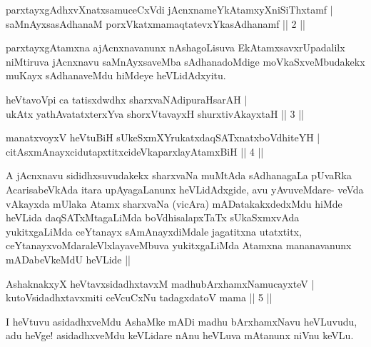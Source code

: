 \begin{shl}
parxtayxgAdhxvXnatxsamuceCxVdi jAcnxnameYkAtamxyXniSiThxtamf |\\
saMnAyxsasAdhanaM porxVkatxmamaqtatevxYkasAdhanamf \hfill || 2 ||
\end{shl}

\begin{artha}
parxtayxgAtamxna ajAcnxnavanunx nAshagoLisuva EkAtamxsavxrUpadalilx niMtiruva jAcnxnavu saMnAyxsaveMba sAdhanadoMdige moVkaSxveMbudakekx muKayx sAdhanaveMdu hiMdeye heVLidAdxyitu.
\end{artha}


\begin{shl}
heVtavoV\s pi ca tatisxdwdhx sharxvaNAdipuraHsarAH |\\
ukAtx yathAvatatxterxYva shorxVtavayxH shurxtivAkayxtaH \hfill || 3 ||
\end{shl}
\begin{shl}
manatxvoyxV heVtuBiH sUkeSxmXYrukatxdaqSATxnatxboVdhiteYH |\\
citAsxmAnayxcidutapxtitxcideVkaparxlayAtamxBiH \hfill || 4 ||
\end{shl}

\begin{artha}
A jAcnxnavu sididhxsuvudakekx sharxvaNa muMtAda sAdhanagaLa pUvaRka
Acarisa\-beVkAda itara upAyagaLanunx heVLidAdxgide, avu yAvuveMdare-
veVda vAkayxda mUlaka Atamx sharxvaNa (vicAra) mADatakakxdedxMdu hiMde
heVLida daqSATxMtagaLiMda boVdhisalapxTaTx sUkaSxmxvAda yukitxgaLiMda
ceYtanayx sAmAnayxdiMdale jagatitxna utatxtitx,
ceYtanayxvoMdaraleVlx\-layaveMbuva yukitxgaLiMda Atamxna mananavanunx
mADabeVkeMdU heVLide ||
\end{artha}


\begin{shl}
AshaknakxyX heVtavxsidadhxtavxM madhubArxhamxNamucayxteV |\\
kutoV\s sidadhxtavxmiti ceVcuCxNu tadagxdatoV mama \hfill || 5 ||
\end{shl}

\begin{artha}
I heVtuvu asidadhxveMdu AshaMke mADi madhu bArxhamxNavu heVLuvudu, adu heVge! asidadhxveMdu keVLidare nAnu heVLuva mAtanunx niVnu keVLu.
\end{artha}

